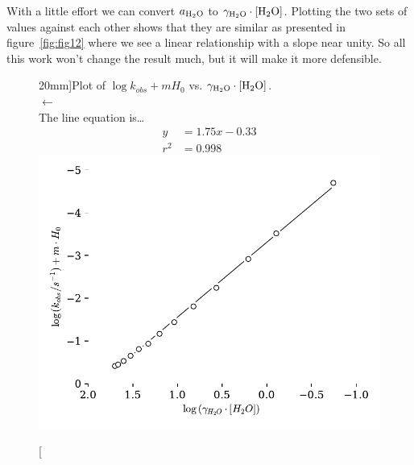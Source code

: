 \documentclass[]{tufte-handout}
\begin{document}
 With a little effort we can convert $a_{\ce{H2O}}$ to $\gamma_{\ce{H2O}} \cdot [\ce{H2O}]$. Plotting the two sets of values against each other shows that they are similar as presented in figure~\ref{fig:fig12} where we see a linear relationship with a slope near unity. So all this work won't change the result much, but it will make it more defensible.

\begin{figure}[h!]
  \centering
  \caption[][20mm]{Plot of $\log{k_{obs}}+m H_0$ vs. $\gamma_{\ce{H2O}} \cdot [\ce{H2O}]$.\\ $\longleftarrow$ \\ The line equation is\ldots \begin{align*}y &= 1.75x-0.33 \\ r^2 &= 0.998\end{align*}} 
  \includegraphics[scale=0.7]{images/fig10}
  \label{fig:fig10}
\end{figure}
\end{document}
